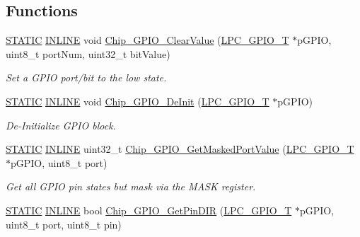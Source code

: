 \subsection*{Functions}
\begin{DoxyCompactItemize}
\item 
\hyperlink{group__LPC__Types__Public__Macros_ga10b2d890d871e1489bb02b7e70d9bdfb}{S\+T\+A\+T\+IC} \hyperlink{group__LPC__Types__Public__Types_ga2eb6f9e0395b47b8d5e3eeae4fe0c116}{I\+N\+L\+I\+NE} void \hyperlink{group__GPIO__17XX__40XX_ga94367ee41db6fa49cfba6605324e8d07}{Chip\+\_\+\+G\+P\+I\+O\+\_\+\+Clear\+Value} (\hyperlink{structLPC__GPIO__T}{L\+P\+C\+\_\+\+G\+P\+I\+O\+\_\+T} $\ast$p\+G\+P\+IO, uint8\+\_\+t port\+Num, uint32\+\_\+t bit\+Value)
\begin{DoxyCompactList}\small\item\em Set a G\+P\+IO port/bit to the low state. \end{DoxyCompactList}\item 
\hyperlink{group__LPC__Types__Public__Macros_ga10b2d890d871e1489bb02b7e70d9bdfb}{S\+T\+A\+T\+IC} \hyperlink{group__LPC__Types__Public__Types_ga2eb6f9e0395b47b8d5e3eeae4fe0c116}{I\+N\+L\+I\+NE} void \hyperlink{group__GPIO__17XX__40XX_ga260a25e615613c663745ed72203dd7a6}{Chip\+\_\+\+G\+P\+I\+O\+\_\+\+De\+Init} (\hyperlink{structLPC__GPIO__T}{L\+P\+C\+\_\+\+G\+P\+I\+O\+\_\+T} $\ast$p\+G\+P\+IO)
\begin{DoxyCompactList}\small\item\em De-\/\+Initialize G\+P\+IO block. \end{DoxyCompactList}\item 
\hyperlink{group__LPC__Types__Public__Macros_ga10b2d890d871e1489bb02b7e70d9bdfb}{S\+T\+A\+T\+IC} \hyperlink{group__LPC__Types__Public__Types_ga2eb6f9e0395b47b8d5e3eeae4fe0c116}{I\+N\+L\+I\+NE} uint32\+\_\+t \hyperlink{group__GPIO__17XX__40XX_gaa5b183d37e81118b37b30a71279c032b}{Chip\+\_\+\+G\+P\+I\+O\+\_\+\+Get\+Masked\+Port\+Value} (\hyperlink{structLPC__GPIO__T}{L\+P\+C\+\_\+\+G\+P\+I\+O\+\_\+T} $\ast$p\+G\+P\+IO, uint8\+\_\+t port)
\begin{DoxyCompactList}\small\item\em Get all G\+P\+IO pin states but mask via the M\+A\+SK register. \end{DoxyCompactList}\item 
\hyperlink{group__LPC__Types__Public__Macros_ga10b2d890d871e1489bb02b7e70d9bdfb}{S\+T\+A\+T\+IC} \hyperlink{group__LPC__Types__Public__Types_ga2eb6f9e0395b47b8d5e3eeae4fe0c116}{I\+N\+L\+I\+NE} bool \hyperlink{group__GPIO__17XX__40XX_ga5f36fe1a2c2b2eb958133c27cb65bee5}{Chip\+\_\+\+G\+P\+I\+O\+\_\+\+Get\+Pin\+D\+IR} (\hyperlink{structLPC__GPIO__T}{L\+P\+C\+\_\+\+G\+P\+I\+O\+\_\+T} $\ast$p\+G\+P\+IO, uint8\+\_\+t port, uint8\+\_\+t pin)

\end{DoxyCompactItemize}
